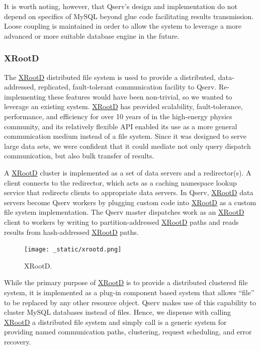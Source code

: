 \documentclass[DM,lsstdraft,toc]{lsstdoc}
\begin{document}
It is worth noting, however, that Qserv's design and implementation do
not depend on specifics of MySQL beyond glue code facilitating results
transmission. Loose coupling is maintained in order to allow the system
to leverage a more advanced or more suitable database engine in the
future.

\subsubsection{XRootD}\label{xrootd}

The \href{http://xrootd.org}{XRootD} distributed file system is used to
provide a distributed, data-addressed, replicated, fault-tolerant
communication facility to Qserv. Re-implementing these features would
have been non-trivial, so we wanted to leverage an existing system.
\href{http://xrootd.org}{XRootD} has provided scalability,
fault-tolerance, performance, and efficiency for over 10 years of in the
high-energy physics community, and its relatively flexible API enabled
its use as a more general communication medium instead of a file system.
Since it was designed to serve large data sets, we were confident that
it could mediate not only query dispatch communication, but also bulk
transfer of results.

A \href{http://xrootd.org}{XRootD} cluster is implemented as a set of
data servers and a redirector(s). A client connects to the redirector,
which acts as a caching namespace lookup service that redirects clients
to appropriate data servers. In Qserv, \href{http://xrootd.org}{XRootD}
data servers become Qserv workers by plugging custom code into
\href{http://xrootd.org}{XRootD} as a custom file system implementation.
The Qserv master dispatches work as an \href{http://xrootd.org}{XRootD}
client to workers by writing to partition-addressed
\href{http://xrootd.org}{XRootD} paths and reads results from
hash-addressed \href{http://xrootd.org}{XRootD} paths.

\begin{figure}[H]
\centering
\texttt{[image: \_static/xrootd.png]}
\caption{XRootD.}
\end{figure}

While the primary purpose of \href{http://xrootd.org}{XRootD} is to
provide a distributed clustered file system, it is implemented as a
plug-in component based system that allows ``file'' to be replaced by
any other resource object. Qserv makes use of this capability to cluster
MySQL databases instead of files. Hence, we dispense with calling
\href{http://xrootd.org}{XRootD} a distributed file system and simply
call is a generic system for providing named communication paths,
clustering, request scheduling, and error recovery.
\end{document}

